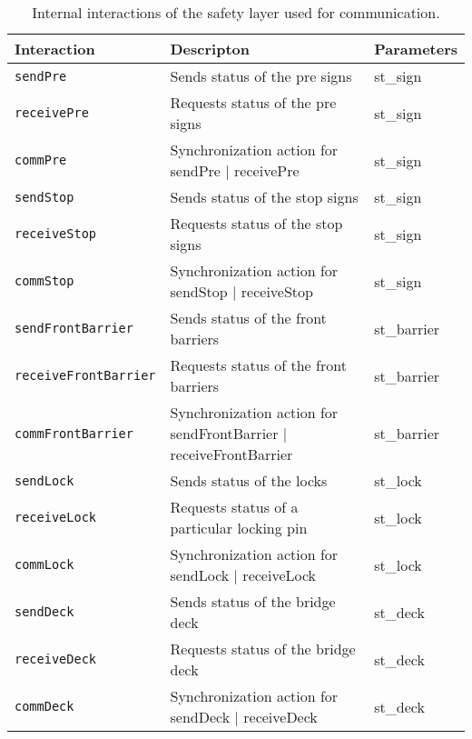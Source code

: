 \begin{table}[htb]%
\begin{tabular}{lll}
			\textbf{Interaction} &	\textbf{Descripton}	&	\textbf{Parameters}\\
      \hline
      
      \texttt{sendPre} & Sends status of the pre signs & st\_sign\\
      \texttt{receivePre} & Requests status of the pre signs & st\_sign\\
      \texttt{commPre} & Synchronization action for sendPre $\mid$ receivePre & st\_sign\\
      
      \texttt{sendStop} & Sends status of the stop signs & st\_sign\\
      \texttt{receiveStop} & Requests status of the stop signs & st\_sign\\
      \texttt{commStop} & Synchronization action for sendStop $\mid$ receiveStop & st\_sign\\
      
      \texttt{sendFrontBarrier} & Sends status of the front barriers & st\_barrier\\
      \texttt{receiveFrontBarrier} & Requests status of the front barriers & st\_barrier\\
      \texttt{commFrontBarrier} & Synchronization action for sendFrontBarrier $\mid$ receiveFrontBarrier & 
      st\_barrier\\
      
      \texttt{sendLock} & Sends status of the locks & st\_lock\\
      \texttt{receiveLock} & Requests status of a particular locking pin & st\_lock\\
      \texttt{commLock} & Synchronization action for sendLock $\mid$ receiveLock & st\_lock\\
      
      \texttt{sendDeck} & Sends status of the bridge deck & st\_deck\\
      \texttt{receiveDeck} & Requests status of the bridge deck & st\_deck\\
      \texttt{commDeck} & Synchronization action for sendDeck $\mid$ receiveDeck & st\_deck\\
\end{tabular}
\caption{Internal interactions of the safety layer used for communication.}
\label{tab:process}
\end{table}
%

